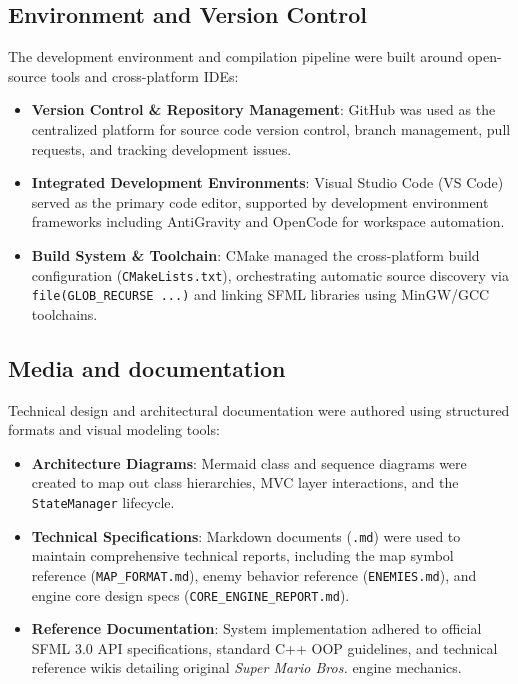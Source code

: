 \documentclass[12pt, a4paper]{article}
\begin{document}
\subsection{Environment and Version Control}

The development environment and compilation pipeline were built around open-source tools and cross-platform IDEs:
\begin{itemize}
\item \textbf{Version Control \& Repository Management}: GitHub was used as the centralized platform for source code version control, branch management, pull requests, and tracking development issues.
\item \textbf{Integrated Development Environments}: Visual Studio Code (VS Code) served as the primary code editor, supported by development environment frameworks including AntiGravity and OpenCode for workspace automation.
\item \textbf{Build System \& Toolchain}: CMake managed the cross-platform build configuration (\texttt{CMakeLists.txt}), orchestrating automatic source discovery via \texttt{file(GLOB\_RECURSE ...)} and linking SFML libraries using MinGW/GCC toolchains.
\end{itemize}

\subsection{Media and documentation}

Technical design and architectural documentation were authored using structured formats and visual modeling tools:
\begin{itemize}
\item \textbf{Architecture Diagrams}: Mermaid class and sequence diagrams were created to map out class hierarchies, MVC layer interactions, and the \texttt{StateManager} lifecycle.
\item \textbf{Technical Specifications}: Markdown documents (\texttt{.md}) were used to maintain comprehensive technical reports, including the map symbol reference (\texttt{MAP\_FORMAT.md}), enemy behavior reference (\texttt{ENEMIES.md}), and engine core design specs (\texttt{CORE\_ENGINE\_REPORT.md}).
\item \textbf{Reference Documentation}: System implementation adhered to official SFML 3.0 API specifications, standard C++ OOP guidelines, and technical reference wikis detailing original \textit{Super Mario Bros.} engine mechanics.
\end{itemize}
\end{document}
